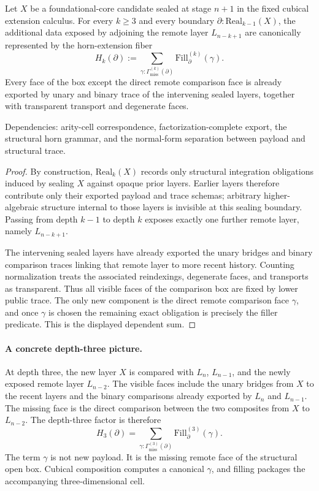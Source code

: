 \documentclass{lmcs}
\begin{document}
\begin{lem}
\label{lem:syntactic-horn-reduction}
Let \(X\) be a foundational-core candidate sealed at stage \(n+1\) in the fixed cubical
extension calculus.  For every \(k\geq 3\) and every boundary
\(\partial:\mathrm{Real}_{k-1}(X)\), the additional data exposed by adjoining the remote layer
\(L_{n-k+1}\) are canonically represented by the horn-extension fiber
\[
  H_k(\partial)
  :=
  \sum_{\gamma:\Gamma_{\mathrm{miss}}^{(k)}(\partial)}
  \mathrm{Fill}^{(k)}_{\partial}(\gamma).
\]
Every face of the box except the direct remote comparison face is already exported by unary
and binary trace of the intervening sealed layers, together with transparent transport and
degenerate faces.

Dependencies: arity-cell correspondence, factorization-complete export, the structural horn
grammar, and the normal-form separation between payload and structural trace.
\end{lem}

\begin{proof}
By construction, \(\mathrm{Real}_k(X)\) records only structural integration obligations induced
by sealing \(X\) against opaque prior layers.  Earlier layers therefore contribute only their
exported payload and trace schemas; arbitrary higher-algebraic structure internal to those
layers is invisible at this sealing boundary.  Passing from depth \(k-1\) to depth \(k\)
exposes exactly one further remote layer, namely \(L_{n-k+1}\).

The intervening sealed layers have already exported the unary bridges and binary comparison
traces linking that remote layer to more recent history.  Counting normalization treats the
associated reindexings, degenerate faces, and transports as transparent.  Thus all visible
faces of the comparison box are fixed by lower public trace.  The only new component is the
direct remote comparison face \(\gamma\), and once \(\gamma\) is chosen the remaining exact
obligation is precisely the filler predicate.  This is the displayed dependent sum.
\end{proof}

\paragraph{A concrete depth-three picture.}
At depth three, the new layer \(X\) is compared with \(L_n\), \(L_{n-1}\), and the newly
exposed remote layer \(L_{n-2}\).  The visible faces include the unary bridges from \(X\) to
the recent layers and the binary comparisons already exported by \(L_n\) and \(L_{n-1}\).
The missing face is the direct comparison between the two composites from \(X\) to
\(L_{n-2}\).  The depth-three factor is therefore
\[
  H_3(\partial)
  =
  \sum_{\gamma:\Gamma_{\mathrm{miss}}^{(3)}(\partial)}
  \mathrm{Fill}^{(3)}_{\partial}(\gamma).
\]
The term \(\gamma\) is not new payload.  It is the missing remote face of the structural open
box.  Cubical composition computes a canonical \(\gamma\), and filling packages the
accompanying three-dimensional cell.
\end{document}
